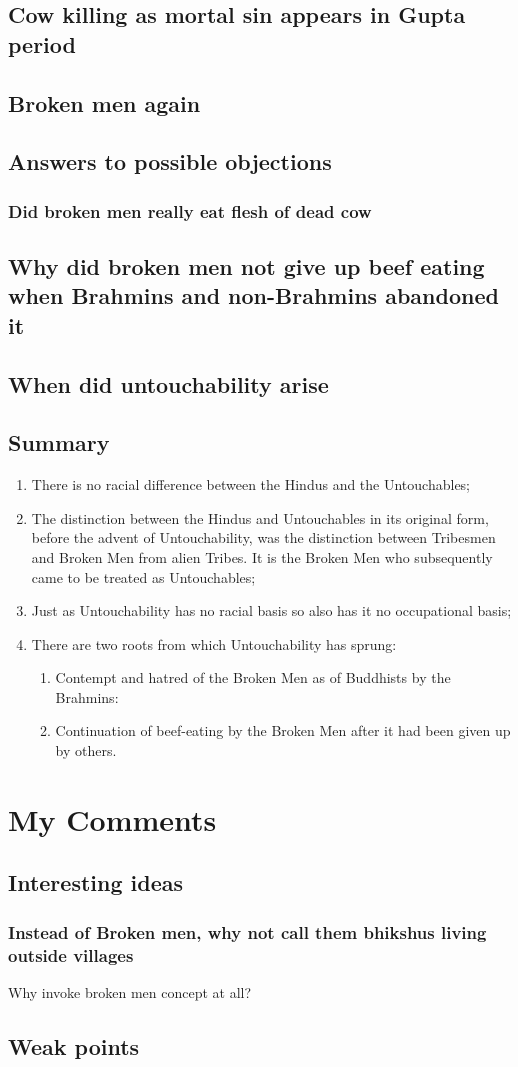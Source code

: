 \documentclass{article}
\begin{document}
\subsection{Cow killing as mortal sin appears in Gupta period}
\subsection{Broken men again}
\subsection{Answers to possible objections}
\subsubsection{Did broken men really eat flesh of dead cow}
\subsection{Why did broken men not give up beef eating when Brahmins and non-Brahmins abandoned it}
\subsection{When did untouchability arise}

\subsection{Summary}
\begin{enumerate}
\item There is no racial difference between the Hindus and the Untouchables;
\item The distinction between the Hindus and Untouchables in its original form, before the advent of Untouchability, was the distinction between Tribesmen and Broken Men from alien Tribes. It is the Broken Men who subsequently came to be treated as Untouchables;
\item Just as Untouchability has no racial basis so also has it no occupational basis;
\item There are two roots from which Untouchability has sprung:
  \begin{enumerate}
  \item Contempt and hatred of the Broken Men as of Buddhists by the Brahmins:
  \item Continuation of beef-eating by the Broken Men after it had been given up by others.
  \end{enumerate}
\end{enumerate}

\section{My Comments}
\subsection{Interesting ideas}
\subsubsection{Instead of Broken men, why not call them bhikshus living outside villages}
Why invoke broken men concept at all?
\subsection{Weak points}



\end{document}
